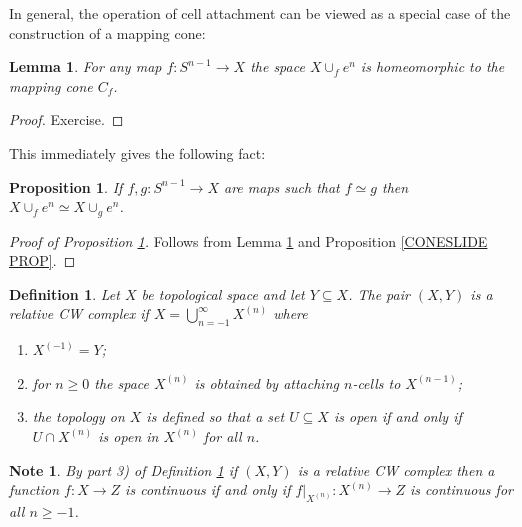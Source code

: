 \documentclass[11pt, letterpaper, oneside]{report}
\theoremstyle{pplain}
\newtheorem{lemma}[theorem]{Lemma}
\newtheorem{proposition}[theorem]{Proposition}
\theoremstyle{ddefinition}
\newtheorem{definition}[theorem]{Definition}
\newtheorem{note}[theorem]{Note}
\theoremstyle{nnn}
\theoremstyle{eexercise}
\newcommand{\benu}{\begin{enumerate}}
\newcommand{\eenu}{\end{enumerate}}
\begin{document}
In general, the operation of cell attachment can be viewed as a special case of the construction of 
a mapping cone:


\begin{lemma}
\label{CONEEQCELL LEMMA}
For any map $f\colon S^{n-1}\to X$ the space $X\cup_{f} e^{n}$ is homeomorphic to 
the mapping cone $C_{f}$. 
\end{lemma}

\begin{proof}
Exercise. 
\end{proof}

This immediately gives the following fact:

\begin{proposition}
\label{CELLSLIDE PROP}
If $f, g\colon S^{n-1}\to X$ are maps such that $f\simeq g$ then $X\cup_{f} e^{n} \simeq X\cup_{g} e^{n}$. 
\end{proposition}





\begin{proof}[Proof of Proposition \ref{CELLSLIDE PROP}]
Follows from Lemma \ref{CONEEQCELL LEMMA} and Proposition \ref{CONESLIDE PROP}.
\end{proof}



\begin{definition}
\label{RELCW DEF}
Let $X$ be topological space and let $Y\subseteq X$. The pair $(X, Y)$ is 
a \emph{relative CW complex} if $X = \bigcup_{n=-1}^{\infty} X^{(n)}$
where 
\benu
\item[1)]
$X^{(-1)} = Y$;
\item[2)] for $n\geq 0$ the space $X^{(n)}$ is obtained by attaching $n$-cells to $X^{(n-1)}$;
\item[3)] the topology on $X$ is defined so that a set $U\subseteq X$ is open if and only if
$U\cap X^{(n)}$ is open in $X^{(n)}$ for all $n$. 
\eenu
\end{definition}

\begin{note}
\label{CW CONT FUNCTIONS NOTE}
By part 3) of Definition \ref{RELCW DEF} if $(X, Y)$ is a relative CW complex then a function 
$f\colon X\to Z$ is continuous if and only if $f|_{X^{(n)}}\colon X^{(n)} \to Z$ is continuous for all $n\geq -1$. 
\end{note}
\end{document}
